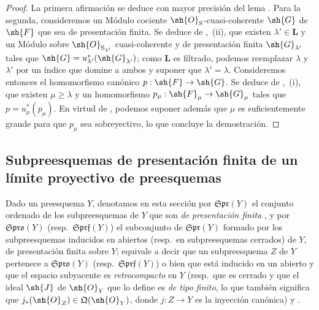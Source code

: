 \begin{proof}
La primera afirmación se deduce con mayor precisión del lema . Para la segunda, consideremos un Módulo cociente $\sh{O}_{\mathrm{S}}$-cuasi-coherente $\sh{G}$ de $\sh{F}$ que sea de presentación finita. Se deduce de ,~(ii), que existen $\lambda'\in\mathbf{L}$ y un Módulo sobre $\sh{O}_{\mathrm{S}_{\lambda'}}$ cuasi-coherente y de presentación finita $\sh{G}_{\lambda'}$ tales que $\sh{G}=u_{\lambda'}^*(\sh{G}_{\lambda'})$; como $\mathbf{L}$ es filtrado, podemos reemplazar $\lambda$ y $\lambda'$ por un índice que domine a ambos y suponer que $\lambda'=\lambda$. Consideremos entonces el homomorfismo canónico $p:\sh{F}\to\sh{G}$. Se deduce de ,~(i), que existen $\mu\geqslant\lambda$ y un homomorfismo $p_\mu:\sh{F}_\mu\to\sh{G}_\mu$ tales que $p=u_\mu^*(p_\mu)$. En virtud de , podemos suponer además que $\mu$ es suficientemente grande para que $p_\mu$ sea sobreyectivo, lo que concluye la demostración.
\end{proof}

\subsection{Subpreesquemas de presentación finita de un límite proyectivo de preesquemas}
\label{subsection:IV.8.6}

\begin{env}[8.6.1]
\label{IV.8.6.1}
Dado un preesquema $Y$, denotamos en esta sección por $\mathfrak{Spr}(Y)$ el conjunto ordenado
 de los subpreesquemas de $Y$ que son \emph{de presentación finita}
, y por $\mathfrak{Spro}(Y)$ (resp.\ $\mathfrak{Sprf}(Y)$) el subconjunto de $\mathfrak{Spr}(Y)$ formado por los subpreesquemas inducidos en abiertos (resp.\ en subpreesquemas cerrados) de $Y$, de presentación finita sobre $Y$; equivale a decir que un subpreesquema $Z$ de $Y$ pertenece a $\mathfrak{Spro}(Y)$ (resp.\ $\mathfrak{Sprf}(Y)$) o bien que está inducido en un abierto y que el espacio subyacente es \emph{retrocompacto} en $Y$ (resp.\ que es cerrado y que el ideal $\sh{J}$ de $\sh{O}_Y$ que lo define es \emph{de tipo finito}, lo que también significa que $j_*(\sh{O}_Z)\in\mathfrak{Q}(\sh{O}_Y)$, donde $j:Z\to Y$ es la inyección canónica)  y .
\end{env}

